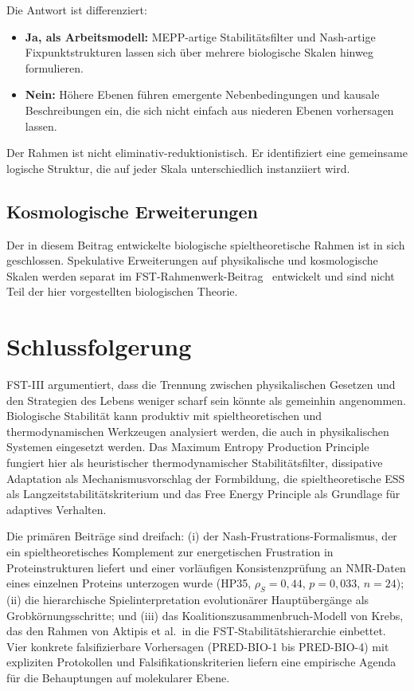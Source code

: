 \documentclass[12pt,a4paper]{article}
\theoremstyle{remark}
\begin{document}
Die Antwort ist differenziert:
\begin{itemize}
    \item \textbf{Ja, als Arbeitsmodell:} MEPP-artige Stabilitätsfilter und Nash-artige Fixpunktstrukturen lassen sich über mehrere biologische Skalen hinweg formulieren.
    \item \textbf{Nein:} Höhere Ebenen führen emergente Nebenbedingungen und kausale Beschreibungen ein, die sich nicht einfach aus niederen Ebenen vorhersagen lassen.
\end{itemize}

Der Rahmen ist nicht eliminativ-reduktionistisch. Er identifiziert eine gemeinsame logische Struktur, die auf jeder Skala unterschiedlich instanziiert wird.

\subsection{Kosmologische Erweiterungen}
\label{sec:cosmology}

Der in diesem Beitrag entwickelte biologische spieltheoretische Rahmen ist in sich geschlossen. Spekulative Erweiterungen auf physikalische und kosmologische Skalen werden separat im FST-Rahmenwerk-Beitrag~\citep{FST-Unified2026} entwickelt und sind nicht Teil der hier vorgestellten biologischen Theorie.


\section{Schlussfolgerung}
\label{sec:conclusion}

FST-III argumentiert, dass die Trennung zwischen physikalischen Gesetzen und den Strategien des Lebens weniger scharf sein könnte als gemeinhin angenommen. Biologische Stabilität kann produktiv mit spieltheoretischen und thermodynamischen Werkzeugen analysiert werden, die auch in physikalischen Systemen eingesetzt werden. Das Maximum Entropy Production Principle fungiert hier als heuristischer thermodynamischer Stabilitätsfilter, dissipative Adaptation als Mechanismusvorschlag der Formbildung, die spieltheoretische ESS als Langzeitstabilitätskriterium und das Free Energy Principle als Grundlage für adaptives Verhalten.

Die primären Beiträge sind dreifach: (i) der Nash-Frustrations-Formalismus, der ein spieltheoretisches Komplement zur energetischen Frustration in Proteinstrukturen liefert und einer vorläufigen Konsistenzprüfung an NMR-Daten eines einzelnen Proteins unterzogen wurde (HP35, $\rho_S = 0{,}44$, $p = 0{,}033$, $n = 24$); (ii) die hierarchische Spielinterpretation evolutionärer Hauptübergänge als Grobkörnungsschritte; und (iii) das Koalitionszusammenbruch-Modell von Krebs, das den Rahmen von Aktipis et al.\ in die FST-Stabilitätshierarchie einbettet. Vier konkrete falsifizierbare Vorhersagen (PRED-BIO-1 bis PRED-BIO-4) mit expliziten Protokollen und Falsifikationskriterien liefern eine empirische Agenda für die Behauptungen auf molekularer Ebene.
\end{document}
